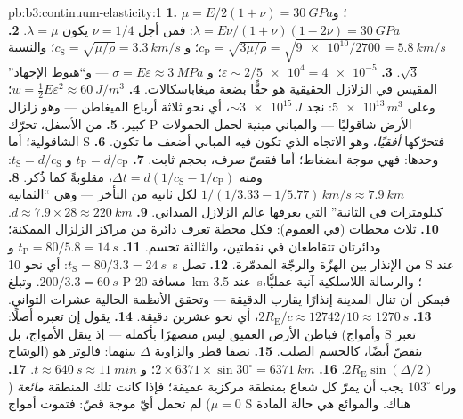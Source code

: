 \begin{solution}{pb:b3:continuum-elasticity:1}
\textbf{1.} $\mu = E/2(1+\nu) = \qty{30}{GPa}$؛ و $\lambda =
E\nu/(1+\nu)(1-2\nu) = \qty{30}{GPa}$: فمن أجل $\nu = 1/4$ يكون $\lambda =
\mu$.
\textbf{2.} $c_{\text{P}} = \sqrt{3\mu/\rho} = \sqrt{\num{9e10}/2700}
= \qty{5.8}{km/s}$؛ و $c_{\text{S}} = \sqrt{\mu/\rho} =
\qty{3.3}{km/s}$؛ والنسبة $\sqrt3$.
\textbf{3.} $\varepsilon \sim 2/\num{5e4} = \num{4e-5}$؛ و $\sigma =
E\varepsilon \approx \qty{3}{MPa}$ --- و``هبوط الإجهاد'' المقيس في
الزلازل الحقيقية هو حقًّا بضعة ميغاباسكالات.
\textbf{4.} $w = \tfrac12 E\varepsilon^2 \approx \qty{60}{J/m^3}$؛
وعلى $\num{5e13}{}\,\unit{m^3}$: نجد $\sim\qty{3e15}{J}$، أي نحو
ثلاثة أرباع الميغاطن --- وهو زلزال كبير.
\textbf{5.} من الأسفل، تحرّك P الأرض شاقوليًا --- والمباني
مبنية لحمل الحمولات الشاقولية؛ أما S فتحرّكها \emph{أفقيًا}،
وهو الاتجاه الذي تكون فيه المباني أضعف ما تكون.
\textbf{6.}  وحدها: فهي موجة انضغاط؛ أما 
فقصّ صرف، بحجم ثابت.
\textbf{7.} $t_{\text{P}} = d/c_{\text{P}}$ و $t_{\text{S}} =
d/c_{\text{S}}$: ومنه $\Delta t = d(1/c_{\text{S}} - 1/c_{\text{P}})$،
مقلوبةً كما ذُكر.
\textbf{8.} $1/(1/3.33 - 1/5.77)\,\unit{km/s} \approx
\qty{7.9}{km}$ لكل ثانية من التأخر --- وهي ``الثمانية كيلومترات
في الثانية'' التي يعرفها عالم الزلازل الميداني.
\textbf{9.} $d \approx 7.9 \times 28 \approx \qty{220}{km}$.
\textbf{10.} ثلاث محطات (في العموم): فكل محطة تعرف دائرة من
مراكز الزلزال الممكنة؛ ودائرتان تتقاطعان في نقطتين، والثالثة
تحسم.
\textbf{11.} $t_{\text{P}} = 80/5.8 = \qty{14}{s}$ و $t_{\text{S}} =
80/3.3 = \qty{24}{s}$: أي نحو \qty{10}{s} من الإنذار بين الهزّة
والرجّة المدمّرة.
\textbf{12.} تصل S عند $200/3.3 = \qty{60}{s}$. وتبلغ P مسافة
\qty{20}{km} عند \qty{3.5}{s}؛ والرسالة اللاسلكية آنية عمليًّا،
فيمكن أن تنال المدينة إنذارًا يقارب الدقيقة ---
وتحقق الأنظمة الحالية عشرات الثواني.
\textbf{13.} $2R_{\text{E}}/c \approx 12742/10 \approx \qty{1270}{s}$،
أي نحو عشرين دقيقة.
\textbf{14.} يقول إن  تعبره أصلًا: فباطن الأرض
العميق ليس منصهرًا بأكمله --- إذ ينقل الأمواج، بل (وأمواج S
تعبر الوشاح) ينقصّ أيضًا، كالجسم الصلب.
\textbf{15.} نصفا قطر والزاوية $\Delta$ بينهما: فالوتر
هو $2R_{\text{E}}\sin(\Delta/2)$.
\textbf{16.} $2 \times 6371 \times \sin30^\circ = \qty{6371}{km}$؛
و $t \approx \qty{640}{s} \approx \qty{11}{min}$.
\textbf{17.} وراء $103^\circ$ يجب أن يمرّ كل شعاع بمنطقة
مركزية عميقة؛ فإذا كانت تلك المنطقة \emph{مائعة} ($\mu = 0$) لم تحمل
أيّ موجة قصّ: فتموت أمواج S هناك. والموائع هي حالة المادة

\end{solution}
